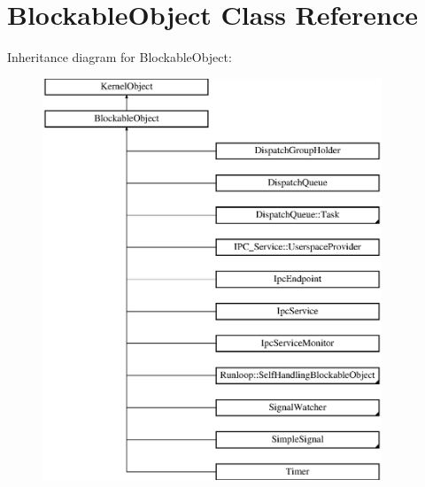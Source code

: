 \hypertarget{class_blockable_object}{}\section{Blockable\+Object Class Reference}
\label{class_blockable_object}
Inheritance diagram for Blockable\+Object\+:\begin{figure}[H]
\begin{center}
\leavevmode
\includegraphics[height=12.000000cm]{class_blockable_object}
\end{center}
\end{figure}

